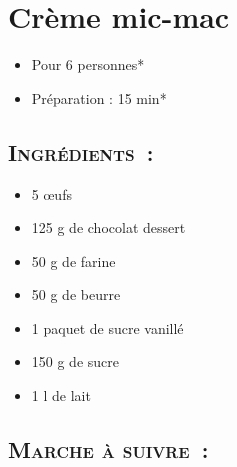 \section{Crème mic-mac}

\begin{itemize}
\item Pour 6 personnes*		%
\item Préparation : 15 min*		%
\end{itemize}

\subsection*{\textsc{Ingrédients~:}}

\begin{itemize}
\item 5 œufs
\item 125 g de chocolat dessert
\item 50 g de farine
\item 50 g de beurre
\item 1 paquet de sucre vanillé
\item 150 g de sucre
\item 1 l de lait
\end{itemize}


\subsection*{\textsc{Marche à suivre~:}}

